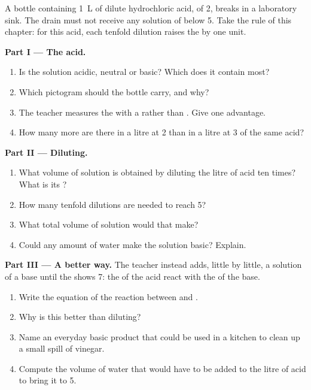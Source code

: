 \begin{problem}
\label{pb:g9:acids-bases-ph:1}
A bottle containing \qty{1}{L} of dilute hydrochloric acid, of  2,
breaks in a laboratory sink. The drain must not receive any solution of
 below 5. Take the rule of this chapter: for this acid, each tenfold
dilution raises the  by one unit.

\medskip
\noindent\textbf{Part I --- The acid.}
\begin{enumerate}
  \item Is the solution acidic, neutral or basic? Which  does it
        contain most?
  \item Which pictogram should the bottle carry, and why?
  \item The teacher measures the  with a  rather than .
        Give one advantage.
  \item How many more   are there in a litre at  2 than in a
        litre at  3 of the same acid?
\end{enumerate}

\medskip
\noindent\textbf{Part II --- Diluting.}
\begin{enumerate}[resume]
  \item What volume of solution is obtained by diluting the litre of
        acid ten times? What is its ?
  \item How many tenfold dilutions are needed to reach  5?
  \item What total volume of solution would that make?
  \item Could any amount of water make the solution basic? Explain.
\end{enumerate}

\medskip
\noindent\textbf{Part III --- A better way.}
The teacher instead adds, little by little, a solution of a base until the
 shows 7: the   of the acid react with the 
 of the base.
\begin{enumerate}[resume]
  \item Write the equation of the reaction between  and 
        .
  \item Why is this better than diluting?
  \item Name an everyday basic product that could be used in a kitchen to
        clean up a small spill of vinegar.
  \item Compute the volume of water that would have to be added to the
        litre of acid to bring it to  5.
\end{enumerate}
\end{problem}

